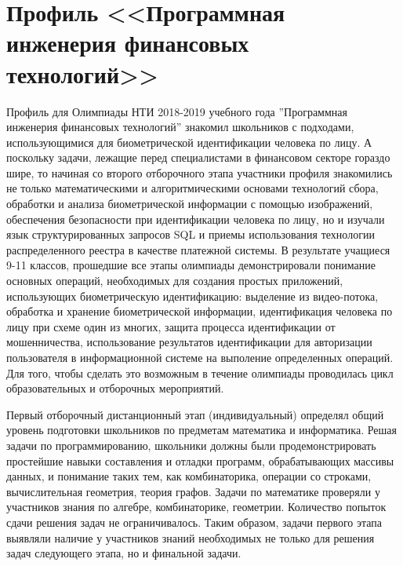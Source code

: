 

\chapter{Профиль <<Программная
инженерия финансовых технологий>>}

Профиль для Олимпиады НТИ 2018-2019 учебного года ''Программная
инженерия финансовых технологий'' знакомил школьников с подходами,
использующимися для биометрической идентификации человека по лицу. А
поскольку задачи, лежащие перед специалистами в финансовом секторе
гораздо шире, то начиная со второго отборочного этапа участники
профиля знакомились не только математическими и алгоритмическими
основами технологий сбора, обработки и анализа биометрической
информации с помощью изображений, обеспечения безопасности при
идентификации человека по лицу, но и изучали язык структурированных
запросов SQL и приемы использования технологии распределенного реестра
в качестве платежной системы. В результате учащиеся 9-11 классов,
прошедшие все этапы олимпиады демонстрировали понимание основных
операций, необходимых для создания простых приложений, использующих
биометрическую идентификацию: выделение из видео-потока, обработка и
хранение биометрической информации, идентификация человека по лицу при
схеме один из многих, защита процесса идентификации от мошенничества,
использование результатов идентификации для авторизации пользователя в
информационной системе на выполение определенных операций. Для того,
чтобы сделать это возможным в течение олимпиады проводилась цикл
образовательных и отборочных мероприятий. 

Первый отборочный дистанционный этап (индивидуальный) определял общий
уровень подготовки школьников по предметам математика и информатика. 
Решая задачи по программированию, школьники должны были
продемонстрировать простейшие навыки составления и отладки программ,
обрабатывающих  массивы данных, и понимание таких тем, как
комбинаторика, операции со строками, вычислительная геометрия, теория
графов. Задачи по математике проверяли у участников  знания по
алгебре, комбинаторике, геометрии. Количество попыток сдачи решения
задач не ограничивалось. Таким образом, задачи первого этапа выявляли
наличие у участников знаний необходимых не только для решения задач
следующего этапа, но и финальной задачи.

